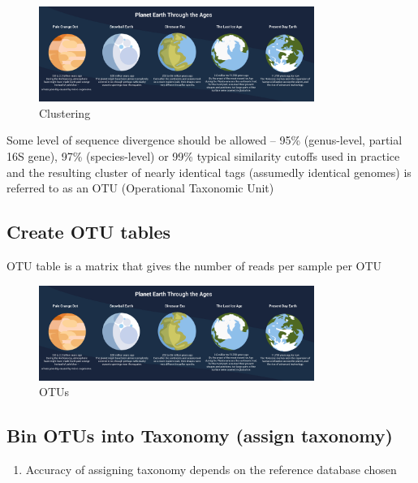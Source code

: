 \documentclass[
]{book}
\providecommand{\tightlist}{%
  \setlength{\itemsep}{0pt}\setlength{\parskip}{0pt}}
\begin{document}
\begin{figure}
\centering
\includegraphics[width=0.8\textwidth,height=\textheight]{./Figures/Planets.png}
\caption{Clustering}
\end{figure}

Some level of sequence divergence should be allowed -- 95\% (genus-level, partial 16S gene), 97\% (species-level) or 99\% typical similarity cutoffs used in
practice and the resulting cluster of nearly identical tags (assumedly identical genomes) is referred to as an OTU (Operational Taxonomic Unit)

\hypertarget{create-otu-tables}{%
\subsection{Create OTU tables}\label{create-otu-tables}}

OTU table is a matrix that gives the number of reads per sample per OTU

\begin{figure}
\centering
\includegraphics[width=0.8\textwidth,height=\textheight]{./Figures/Planets.png}
\caption{OTUs}
\end{figure}

\hypertarget{bin-otus-into-taxonomy-assign-taxonomy}{%
\subsection{Bin OTUs into Taxonomy (assign taxonomy)}\label{bin-otus-into-taxonomy-assign-taxonomy}}

\begin{enumerate}
\def\labelenumi{\arabic{enumi}.}
\tightlist
\item
  Accuracy of assigning taxonomy depends on the
  reference database chosen
\end{enumerate}
\end{document}
